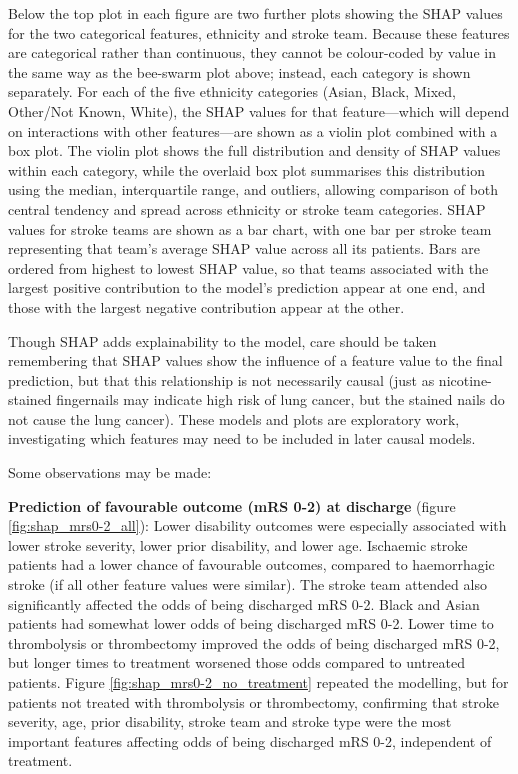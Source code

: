 Below the top plot in each figure are two further plots showing the SHAP values for the two categorical features, ethnicity and stroke team. Because these features are categorical rather than continuous, they cannot be colour-coded by value in the same way as the bee-swarm plot above; instead, each category is shown separately. For each of the five ethnicity categories (Asian, Black, Mixed, Other/Not Known, White), the SHAP values for that feature—which will depend on interactions with other features—are shown as a violin plot combined with a box plot. The violin plot shows the full distribution and density of SHAP values within each category, while the overlaid box plot summarises this distribution using the median, interquartile range, and outliers, allowing comparison of both central tendency and spread across ethnicity or stroke team categories. SHAP values for stroke teams are shown as a bar chart, with one bar per stroke team representing that team's average SHAP value across all its patients. Bars are ordered from highest to lowest SHAP value, so that teams associated with the largest positive contribution to the model's prediction appear at one end, and those with the largest negative contribution appear at the other.

Though SHAP adds explainability to the model, care should be taken remembering that SHAP values show the influence of a feature value to the final prediction, but that this relationship is not necessarily causal (just as nicotine-stained fingernails may indicate high risk of lung cancer, but the stained nails do not cause the lung cancer). These models and plots are exploratory work, investigating which features may need to be included in later causal models.

Some observations may be made:

\textbf{Prediction of favourable outcome (mRS 0-2) at discharge} (figure \ref{fig:shap_mrs0-2_all}): Lower disability outcomes were especially associated with lower stroke severity, lower prior disability, and lower age. Ischaemic stroke patients had a lower chance of favourable outcomes, compared to haemorrhagic stroke (if all other feature values were similar). The stroke team attended also significantly affected the odds of being discharged mRS 0-2. Black and Asian patients had somewhat lower odds of being discharged mRS 0-2. Lower time to thrombolysis or thrombectomy improved the odds of being discharged mRS 0-2, but longer times to treatment worsened those odds compared to untreated patients. Figure \ref{fig:shap_mrs0-2_no_treatment} repeated the modelling, but for patients not treated with thrombolysis or thrombectomy, confirming that stroke severity, age, prior disability, stroke team and stroke type were the most important features affecting odds of being discharged mRS 0-2, independent of treatment.

